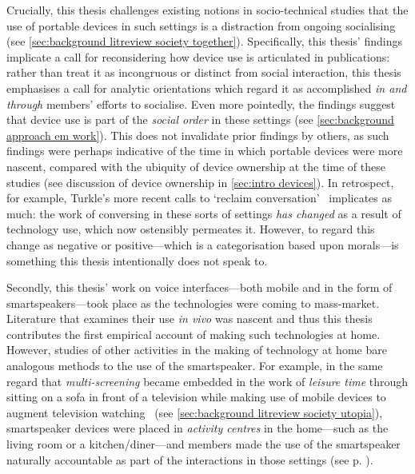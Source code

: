 \begin{corrections}
Crucially, this thesis challenges existing notions in socio-technical studies that the use of portable devices in such settings is a distraction from ongoing socialising (see \ref{sec:background litreview society together}).
Specifically, this thesis' findings implicate a call for reconsidering how device use is articulated in publications: rather than treat it as incongruous or distinct from social interaction, this thesis emphasises a call for analytic orientations which regard it as accomplished  \textit{in and through} members' efforts to socialise.
Even more pointedly, the findings suggest that device use is part of the \textit{social order} in these settings (see \ref{sec:background approach em work}).
This does not invalidate prior findings by others, as such findings were perhaps indicative of the time in which portable devices were more nascent, compared with the ubiquity of device ownership at the time of these studies (see discussion of device ownership in \ref{sec:intro devices}).
In retrospect, for example, Turkle's more recent calls to `reclaim conversation'~\citep[see p. \pageref{line:reclaimingconv}]{Turkle2015} implicates as much: the work of conversing in these sorts of settings \textit{has changed} as a result of technology use, which now ostensibly permeates it.
However, to regard this change as negative or positive---which is a categorisation based upon morals---is something this thesis intentionally does not speak to.

Secondly, this thesis' work on voice interfaces---both mobile and in the form of smartspeakers---took place as the technologies were coming to mass-market.
Literature that examines their use \textit{in vivo} was nascent and thus this thesis contributes the first empirical account of making such technologies at home.
However, studies of other activities in the making of technology at home bare analogous methods to the use of the smartspeaker.
For example, in the same regard that \textit{multi-screening} became embedded in the work of \textit{leisure time} through sitting on a sofa in front of a television while making use of mobile devices to augment television watching~\citep{Rooksby2015} (see \ref{sec:background litreview society utopia}), smartspeaker devices were placed in \textit{activity centres} in the home---such as the living room or a kitchen/diner---and members made the use of the smartspeaker naturally accountable as part of the interactions in those settings (see p. \pageref{line:activitycentres}).


\end{corrections}
